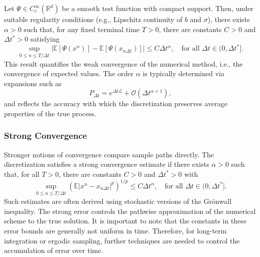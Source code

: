 \documentclass[11pt, twoside]{report}
\begin{document}
Let $\Psi \in C^\infty_c(\mathbb{R}^d)$ be a smooth test function with compact support. Then, under suitable regularity conditions (e.g., Lipschitz continuity of $b$ and $\sigma$), there exists $\alpha > 0$ such that, for any fixed terminal time $T > 0$, there are constants $C > 0$ and $\Delta t^* > 0$ satisfying
\[
\sup_{0 \leq n \leq T/\Delta t} \left| \mathbb{E}[\Psi(x^n)] - \mathbb{E}[\Psi(x_{n\Delta t})] \right| \leq C \Delta t^\alpha,
\quad \text{for all } \Delta t \in (0, \Delta t^*].
\]
This result quantifies the weak convergence of the numerical method, i.e., the convergence of expected values. The order $\alpha$ is typically determined via expansions such as
\[
P_{\Delta t} = e^{\Delta t \mathcal{L}} + \mathcal{O}(\Delta t^{\alpha+1}),
\]
and reflects the accuracy with which the discretization preserves average properties of the true process.

\subsubsection{Strong Convergence}

Stronger notions of convergence compare sample paths directly. The discretization satisfies a strong convergence estimate if there exists $\alpha > 0$ such that, for all $T > 0$, there are constants $C > 0$ and $\Delta t^* > 0$ with
\[
\sup_{0 \leq n \leq T/\Delta t} \left( \mathbb{E} \left| x^n - x_{n\Delta t} \right|^p \right)^{1/p} \leq C \Delta t^\alpha,
\quad \text{for all } \Delta t \in (0, \Delta t^*].
\]
Such estimates are often derived using stochastic versions of the Gr\"{o}nwall inequality. The strong error controls the pathwise approximation of the numerical scheme to the true solution.
It is important to note that the constants in these error bounds are generally not uniform in time. Therefore, for long-term integration or ergodic sampling, further techniques are needed to control the accumulation of error over time.
\end{document}
